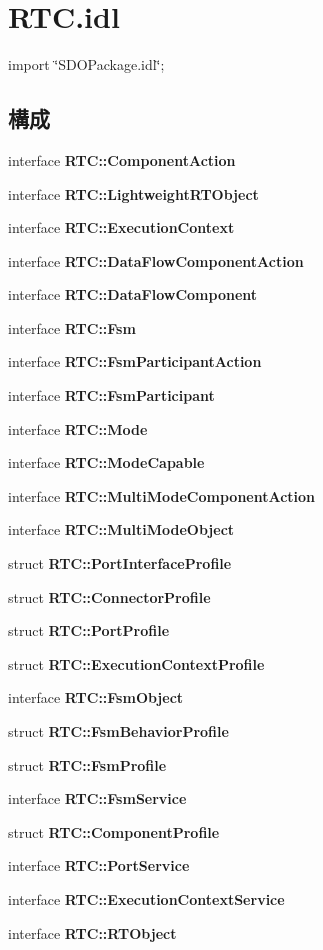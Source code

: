 \section{RTC.idl}
\label{RTC_8idl}
{\ttfamily import \char`\"{}SDOPackage.idl\char`\"{};}\par
\subsection*{構成}
\begin{DoxyCompactItemize}
\item 
interface {\bf RTC::ComponentAction}
\item 
interface {\bf RTC::LightweightRTObject}
\item 
interface {\bf RTC::ExecutionContext}
\item 
interface {\bf RTC::DataFlowComponentAction}
\item 
interface {\bf RTC::DataFlowComponent}
\item 
interface {\bf RTC::Fsm}
\item 
interface {\bf RTC::FsmParticipantAction}
\item 
interface {\bf RTC::FsmParticipant}
\item 
interface {\bf RTC::Mode}
\item 
interface {\bf RTC::ModeCapable}
\item 
interface {\bf RTC::MultiModeComponentAction}
\item 
interface {\bf RTC::MultiModeObject}
\item 
struct {\bf RTC::PortInterfaceProfile}
\item 
struct {\bf RTC::ConnectorProfile}
\item 
struct {\bf RTC::PortProfile}
\item 
struct {\bf RTC::ExecutionContextProfile}
\item 
interface {\bf RTC::FsmObject}
\item 
struct {\bf RTC::FsmBehaviorProfile}
\item 
struct {\bf RTC::FsmProfile}
\item 
interface {\bf RTC::FsmService}
\item 
struct {\bf RTC::ComponentProfile}
\item 
interface {\bf RTC::PortService}
\item 
interface {\bf RTC::ExecutionContextService}
\item 
interface {\bf RTC::RTObject}
\end{DoxyCompactItemize}
